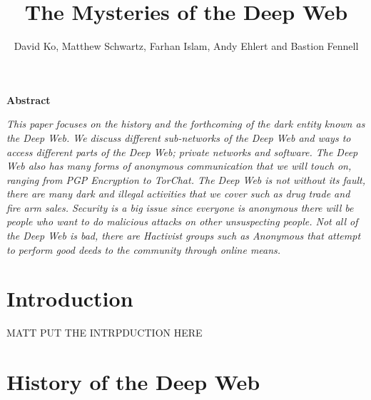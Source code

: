 \documentclass[twocolumn,letterpaper,10pt]{article}
\begin{document}
\title{\vspace*{0.5in}%
The Mysteries of the Deep Web}
\author{\large David Ko, Matthew Schwartz, Farhan Islam, Andy Ehlert and Bastion Fennell}

\maketitle
\thispagestyle{empty}

\centerline{{\bf\large Abstract}}

{\it This paper focuses on the history and the forthcoming of the dark entity known as the Deep Web. We discuss different sub-networks of the Deep Web and ways to access different parts of the Deep Web; private networks and software. The Deep Web also has many forms of anonymous communication that we will touch on, ranging from PGP Encryption to TorChat. The Deep Web is not without its fault, there are many dark and illegal activities that we cover such as drug trade and fire arm sales. Security is a big issue since everyone is anonymous there will be people who want to do malicious attacks on other unsuspecting people. Not all of the Deep Web is bad, there are Hactivist groups such as Anonymous that attempt to perform good deeds to the community through online means.}

\section{Introduction}

MATT PUT THE INTRPDUCTION HERE

\section{History of the Deep Web}
\end{document}

